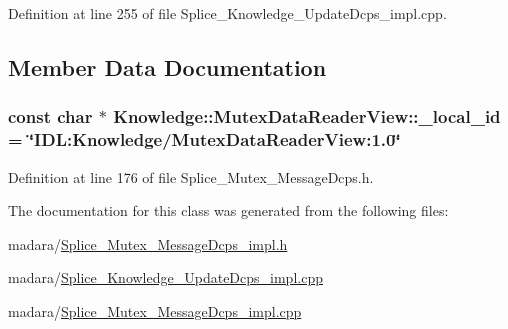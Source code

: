 Definition at line 255 of file Splice\_\-Knowledge\_\-UpdateDcps\_\-impl.cpp.



\subsection{Member Data Documentation}
\hypertarget{classKnowledge_1_1MutexDataReaderView_a807ab0ccc917184fa6f2ab18558fc0d5}{
\subsubsection[{\_\-local\_\-id}]{\setlength{\rightskip}{0pt plus 5cm}const char $\ast$ {\bf Knowledge::MutexDataReaderView::\_\-local\_\-id} = \char`\"{}IDL:Knowledge/MutexDataReaderView:1.0\char`\"{}}}
\label{db/d72/classKnowledge_1_1MutexDataReaderView_a807ab0ccc917184fa6f2ab18558fc0d5}


Definition at line 176 of file Splice\_\-Mutex\_\-MessageDcps.h.



The documentation for this class was generated from the following files:\begin{DoxyCompactItemize}
\item 
madara/\hyperlink{Splice__Mutex__MessageDcps__impl_8h}{Splice\_\-Mutex\_\-MessageDcps\_\-impl.h}\item 
madara/\hyperlink{Splice__Knowledge__UpdateDcps__impl_8cpp}{Splice\_\-Knowledge\_\-UpdateDcps\_\-impl.cpp}\item 
madara/\hyperlink{Splice__Mutex__MessageDcps__impl_8cpp}{Splice\_\-Mutex\_\-MessageDcps\_\-impl.cpp}\end{DoxyCompactItemize}
